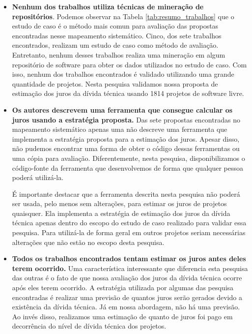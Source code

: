 \begin{itemize}
\item \textbf{Nenhum dos trabalhos utiliza técnicas de mineração de repositórios}.  Podemos observar na Tabela \ref{tab:resumo_trabalhos} que o estudo de caso é o método mais comun para avaliação das propostas encontradas nesse mapeamento sistemático. Cinco, dos sete trabalhos encontrados, realizam um estudo de caso como método de avaliação. Entretanto, nenhum desses trabalhos realiza uma mineração em algum repositório de software para obter os dados utilizados no estudo de caso. Com isso, nenhum dos trabalhos encontrados é validado utilizando uma grande quantidade de projetos. Nesta pesquisa validamos nossa proposta de estimação dos juros da dívida técnica usando 1814 projetos de software livre. 
\item \textbf{Os autores descrevem uma ferramenta que consegue calcular os juros usando a estratégia proposta.} Das sete propostas encontradas no mapeamento sistemático apenas uma não descreve uma ferramenta que implementa a estratégia proposta para a estimação dos juros. Apesar disso, não pudemos encontrar uma forma de obter o código dessas ferramentas ou uma cópia para avaliação. Diferentemente, nesta pesquisa, disponibilizamos o código-fonte da ferramenta que desenvolvemos de forma que qualquer pessoa poderá utilizá-la.
 
É importante destacar que a ferramenta descrita nesta pesquisa não poderá ser usada, pelo menos sem alterações, para estimar os juros de projetos quaisquer. Ela implementa a estratégia de estimação dos juros da dívida técnica apenas dentro do escopo do estudo de caso realizado para validar essa pesquisa. Para utilizá-la de forma geral em outros projetos seriam necessárias alterações que não estão no escopo desta pesquisa. 

\item \textbf{Todos os trabalhos encontrados tentam estimar os juros antes deles terem ocorrido.} Uma característica interessante que diferencia esta pesquisa das outras é o fato de que nossa avaliação dos juros da dívida técnica ocorre após eles terem ocorrido. A estratégia utilizada por algumas das pesquisa encontradas é realizar uma previsão de quantos juros serão gerados devido a existência da dívida técnica. Já em nossa abordagem, não há uma previsão. Ao invés disso, realizamos uma estimação de quanto de juros foi pago em decorrência do nível de dívida técnica dos projetos. 

\end{itemize}




